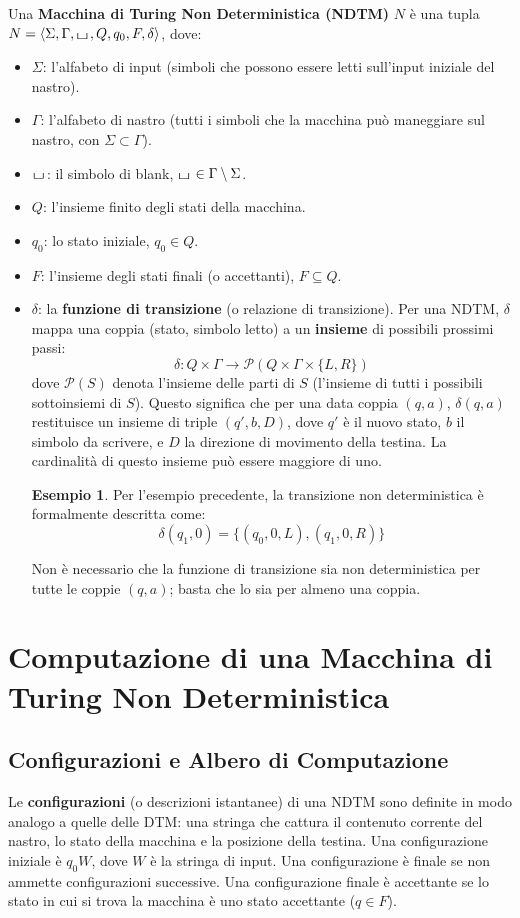 \documentclass[a4paper]{article}
\theoremstyle{definition} %
\newtheorem{example}{Esempio}
\newcommand{\blankS}{\ensuremath{\raisebox{-0.15ex}{\scalebox{1.3}[0.7]{$\sqcup$}}\mkern2mu}}
\begin{document}
Una \textbf{Macchina di Turing Non Deterministica (NDTM)} $N$ è una tupla $N = \langle \Sigma, \Gamma, \blankS, Q, q_0, F, \delta \rangle$, dove:
\begin{itemize}
    \item $\Sigma$: l'alfabeto di input (simboli che possono essere letti sull'input iniziale del nastro).
    \item $\Gamma$: l'alfabeto di nastro (tutti i simboli che la macchina può maneggiare sul nastro, con $\Sigma \subset \Gamma$).
    \item $\blankS$: il simbolo di blank, $\blankS \in \Gamma \setminus \Sigma$.
    \item $Q$: l'insieme finito degli stati della macchina.
    \item $q_0$: lo stato iniziale, $q_0 \in Q$.
    \item $F$: l'insieme degli stati finali (o accettanti), $F \subseteq Q$.
    \item $\delta$: la \textbf{funzione di transizione} (o relazione di transizione). Per una NDTM, $\delta$ mappa una coppia (stato, simbolo letto) a un \textbf{insieme} di possibili prossimi passi:
    \[ \delta: Q \times \Gamma \to \mathcal{P}(Q \times \Gamma \times \{L, R\}) \]
    dove $\mathcal{P}(S)$ denota l'insieme delle parti di $S$ (l'insieme di tutti i possibili sottoinsiemi di $S$). Questo significa che per una data coppia $(q, a)$, $\delta(q, a)$ restituisce un insieme di triple $(q', b, D)$, dove $q'$ è il nuovo stato, $b$ il simbolo da scrivere, e $D$ la direzione di movimento della testina. La cardinalità di questo insieme può essere maggiore di uno.

    \begin{example}
    Per l'esempio precedente, la transizione non deterministica è formalmente descritta come:
    \[ \delta(q_1, 0) = \{ (q_0, 0, L), (q_1, 0, R) \} \]
    \end{example}
    Non è necessario che la funzione di transizione sia non deterministica per tutte le coppie $(q,a)$; basta che lo sia per almeno una coppia.
\end{itemize}

\section{Computazione di una Macchina di Turing Non Deterministica}

\subsection{Configurazioni e Albero di Computazione}
Le \textbf{configurazioni} (o descrizioni istantanee) di una NDTM sono definite in modo analogo a quelle delle DTM: una stringa che cattura il contenuto corrente del nastro, lo stato della macchina e la posizione della testina.
Una configurazione iniziale è $q_0W$, dove $W$ è la stringa di input.
Una configurazione è finale se non ammette configurazioni successive. Una configurazione finale è accettante se lo stato in cui si trova la macchina è uno stato accettante ($q \in F$).
\end{document}
